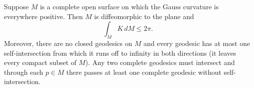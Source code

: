 Suppose $M$ is a complete open surface on which the Gauss curvature is everywhere positive. Then $M$ is diffeomorphic to the plane and
$$\int_M K \, dM \leq 2\pi.$$
Moreover, there are no closed geodesics on $M$ and every geodesic has at most one self-intersection from which it runs off to infinity in both directions (it leaves every compact subset of $M$). Any two complete geodesics must intersect and through each $p \in M$ there passes at least one complete geodesic without self-intersection.
